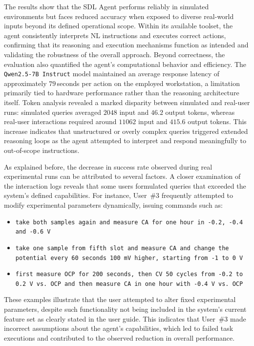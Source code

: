 
The results show that the SDL Agent performs reliably in simulated environments but faces reduced accuracy when exposed to diverse real-world inputs beyond its defined operational scope. Within its available toolset, the agent consistently interprets NL instructions and executes correct actions, confirming that its reasoning and execution mechanisms function as intended and validating the robustness of the overall approach. Beyond correctness, the evaluation also quantified the agent’s computational behavior and efficiency. The \texttt{Qwen2.5-7B Instruct} model maintained an average response latency of approximately $79$\,seconds per action on the employed workstation, a limitation primarily tied to hardware performance rather than the reasoning architecture itself. Token analysis revealed a marked disparity between simulated and real-user runs: simulated queries averaged $2048$ input and $46.2$ output tokens, whereas real-user interactions required around $11062$ input and $415.6$ output tokens. This increase indicates that unstructured or overly complex queries triggered extended reasoning loops as the agent attempted to interpret and respond meaningfully to out-of-scope instructions. 

As explained before, the decrease in success rate observed during real experimental runs can be attributed to several factors. A closer examination of the interaction logs reveals that some users formulated queries that exceeded the system’s defined capabilities. For instance, User~\#3 frequently attempted to modify experimental parameters dynamically, issuing commands such as:

\begin{itemize}
    \item \texttt{take both samples again and measure CA for one hour in -0.2, -0.4 and -0.6 V}
    \item \texttt{take one sample from fifth slot and measure CA and change the potential every 60 seconds 100 mV higher, starting from -1 to 0 V}
    \item \texttt{first measure OCP for 200 seconds, then CV 50 cycles from -0.2 to 0.2 V vs. OCP and then measure CA in one hour with -0.4 V vs. OCP}
\end{itemize}

These examples illustrate that the user attempted to alter fixed experimental parameters, despite such functionality not being included in the system’s current feature set as clearly stated in the user guide. This indicates that User~\#3 made incorrect assumptions about the agent’s capabilities, which led to failed task executions and contributed to the observed reduction in overall performance.

